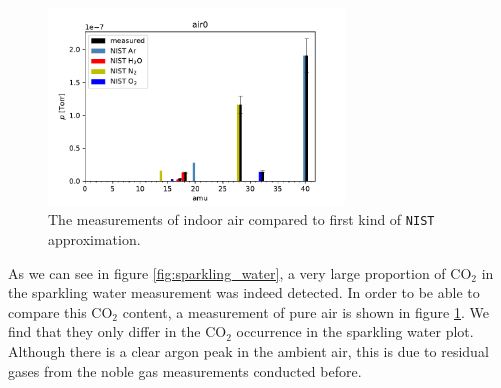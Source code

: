     
    
    \begin{figure}[h!]
    \centering
    \includegraphics[width=0.7\textwidth]{Report/DataResultsPlots/air0.pdf}
    \caption{The measurements of indoor air compared to first kind of \texttt{NIST} approximation.}
    \label{fig:air0}
    \end{figure}
    
    As we can see in figure \ref{fig:sparkling_water}, a very large proportion of CO$_2$ in the sparkling water measurement was indeed detected. In order to be able to compare this CO$_2$ content, a measurement of pure air is shown in figure \ref{fig:air0}. We find that they only differ in the CO$_2$ occurrence in the sparkling water plot. Although there is a clear argon peak in the ambient air, this is due to residual gases from the noble gas measurements conducted before. 
    \FloatBarrier
    